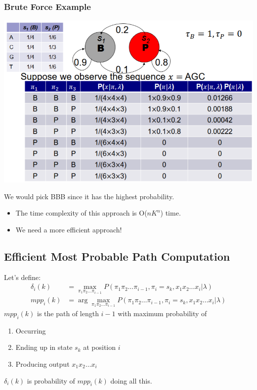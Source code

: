\documentclass[10pt]{article}
\begin{document}
\subsubsection*{Brute Force Example}
\begin{center} 
	\includegraphics*[width=\textwidth]{W9_23.png} 
\end{center}
We would pick BBB since it has the highest probability.
\begin{itemize}
	\item The time complexity of this approach is O($nK^n$) time.
	\item We need a more efficient approach!
\end{itemize}

\subsection*{Efficient Most Probable Path Computation}
Let's define:
\begin{align*}
    \delta_i(k) &= \max_{\pi_1 \pi_2 \dots \pi_{i - 1}} P(\pi_1 \pi_2 \dots \pi_{i - 1}, \pi_i = s_k, x_1 x_2 \dots x_i | \lambda)\\
    mpp_i(k) &= \arg \max_{\pi_1 \pi_2 \dots \pi_{i - 1}} P(\pi_1 \pi_2 \dots \pi_{i - 1}, \pi_i = s_k, x_1 x_2 \dots x_i | \lambda)
\end{align*}
$mpp_i(k)$ is the path of length $i - 1$ with maximum probability of
\begin{enumerate}
    \item Occurring
    \item Ending up in state $s_k$ at position $i$
    \item Producing output $x_1 x_2 \dots x_i$
\end{enumerate}
$\delta_i(k)$ is probability of $mpp_i(k)$ doing all this.
\end{document}
